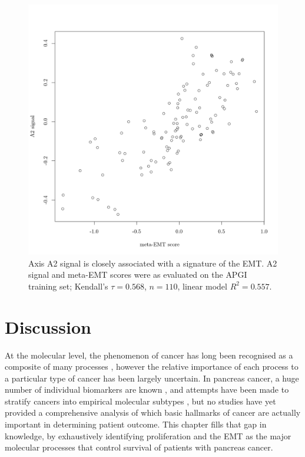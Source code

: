 \documentclass[dissertation.tex]{subfiles}
\begin{document}
\begin{figure}
\centering
\includegraphics[width=.7\linewidth]{analysis/biosurv/reports/18_SIS_diag_dsd_final/figure/nmf-msigdb-cor-plots-8}
\caption[A2 signal is closely associated with meta-EMT score]{Axis A2 signal is closely associated with a signature of the \gls{EMT}.  A2 signal and meta-EMT \cite{Groger2012} scores were as evaluated on the \acrshort{APGI} training set; Kendall's $\tau = 0.568$, $n = 110$, linear model $R^2 = 0.557$.}\label{fig:sigs-axis2-emt}
\end{figure}

\section{Discussion}
At the molecular level, the phenomenon of cancer has long been recognised as a composite of many processes \cite{Hanahan2011}, however the relative importance of each process to a particular type of cancer has been largely uncertain.  In pancreas cancer, a huge number of individual biomarkers are known \cite{Harsha2009}, and attempts have been made to stratify cancers into empirical molecular subtypes \cite{Collisson2011}, but no studies have yet provided a comprehensive analysis of which basic hallmarks of cancer are actually important in determining patient outcome.  This chapter fills that gap in knowledge, by exhaustively identifying proliferation and the \gls{EMT} as the major molecular processes that control survival of patients with pancreas cancer.

\end{document}
